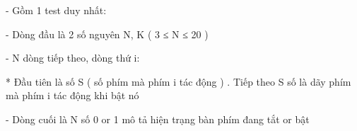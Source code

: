 - Gồm 1 test duy nhất:  

   - Dòng đầu là 2 số nguyên N, K ( 3 ≤ N ≤ 20 )  

   - N dòng tiếp theo, dòng thứ i:  

   * Đầu tiên là số S ( số phím mà phím i tác động ) . Tiếp theo S số là dãy phím mà phím i tác động khi bật nó  

   - Dòng cuối là N số 0 or 1 mô tả hiện trạng bàn phím đang tắt or bật  

\